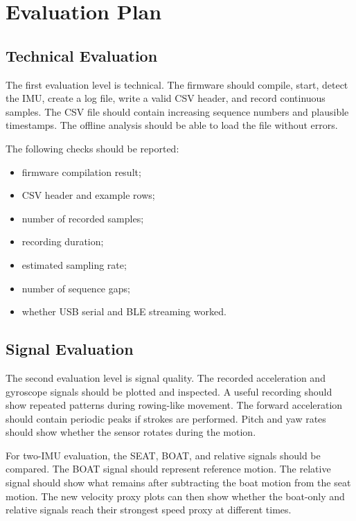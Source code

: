 \chapter{Evaluation Plan} %

\section{Technical Evaluation}

The first evaluation level is technical. The firmware should compile, start, detect the IMU, create a log file, write a valid CSV header, and record continuous samples. The CSV file should contain increasing sequence numbers and plausible timestamps. The offline analysis should be able to load the file without errors.

The following checks should be reported:

\begin{itemize}
  \item firmware compilation result;
  \item CSV header and example rows;
  \item number of recorded samples;
  \item recording duration;
  \item estimated sampling rate;
  \item number of sequence gaps;
  \item whether USB serial and BLE streaming worked.
\end{itemize}

\section{Signal Evaluation}

The second evaluation level is signal quality. The recorded acceleration and gyroscope signals should be plotted and inspected. A useful recording should show repeated patterns during rowing-like movement. The forward acceleration should contain periodic peaks if strokes are performed. Pitch and yaw rates should show whether the sensor rotates during the motion.

For two-IMU evaluation, the SEAT, BOAT, and relative signals should be compared. The BOAT signal should represent reference motion. The relative signal should show what remains after subtracting the boat motion from the seat motion. The new velocity proxy plots can then show whether the boat-only and relative signals reach their strongest speed proxy at different times.

